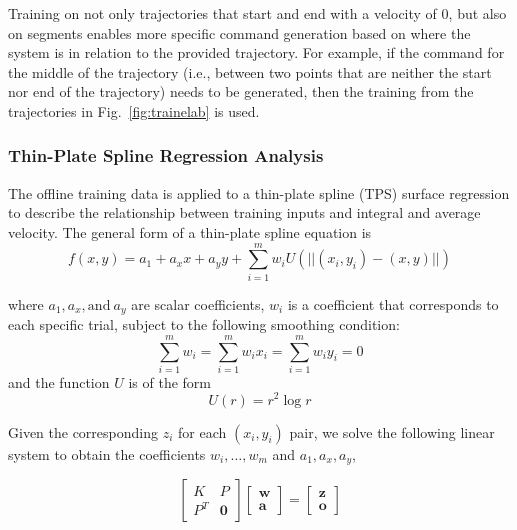 \documentclass[letterpaper, 10 pt, conference]{ieeeconf}  %
\newcommand\NB[1]{$\spadesuit$\footnote{NB: #1}}
\begin{document}
Training on not only trajectories that start and end with a velocity of $0$, but also on segments enables more specific command generation based on where the system is in relation to the provided trajectory. For example, if the command for the middle of the trajectory (i.e., between two points that are neither the start nor end of the trajectory) needs to be generated, then the training from the trajectories in Fig.~\ref{fig:trainelab} is used.


\subsubsection{Thin-Plate Spline Regression Analysis}

The offline training data is applied to a thin-plate spline (TPS) surface regression to describe the relationship between training inputs and integral and average velocity. The general form of a thin-plate spline equation is 
\begin{equation}
    f(x,y) = a_1 + a_xx + a_yy + \sum_{i=1}^mw_iU(||(x_i,y_i)-(x,y)||)
\end{equation}

where $a_1,a_x,\text{and}~a_y$ are scalar coefficients, $w_i$ is a coefficient that corresponds to each specific trial, subject to the following smoothing condition: \begin{equation}
\sum_{i=1}^mw_i=\sum_{i=1}^mw_ix_i=\sum_{i=1}^mw_iy_i=0
\end{equation}
and the function $U$ is of the form
\begin{equation}
  U(r) = r^2\log{r} 
\end{equation}

Given the corresponding $z_i$ for each $(x_i,y_i)$ pair, we solve the following linear system to obtain the coefficients $w_i,\ldots,w_m$ and $a_1,a_x,a_y$,

\begin{equation}
    \begin{bmatrix}
    K&P\\
    P^T& \bm{0}
    \end{bmatrix}
    \begin{bmatrix}
    \bm{w}\\
    \bm{a}
    \end{bmatrix} = 
    \begin{bmatrix}
    \bm{z}\\
    \bm{o}
    \end{bmatrix}
\end{equation}
\end{document}
